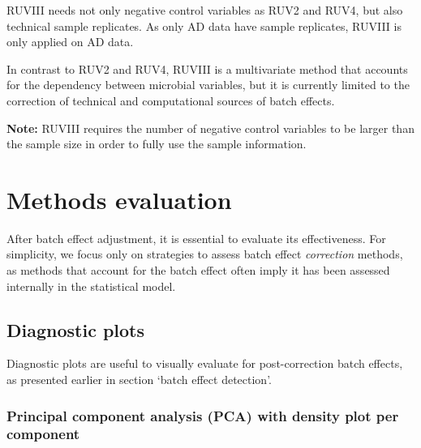 \documentclass[]{book}
\newenvironment{Shaded}{\begin{snugshade}}{\end{snugshade}}
\newcommand{\KeywordTok}[1]{\textcolor[rgb]{0.13,0.29,0.53}{\textbf{#1}}}
\newcommand{\DataTypeTok}[1]{\textcolor[rgb]{0.13,0.29,0.53}{#1}}
\newcommand{\StringTok}[1]{\textcolor[rgb]{0.31,0.60,0.02}{#1}}
\newcommand{\CommentTok}[1]{\textcolor[rgb]{0.56,0.35,0.01}{\textit{#1}}}
\newcommand{\OperatorTok}[1]{\textcolor[rgb]{0.81,0.36,0.00}{\textbf{#1}}}
\newcommand{\NormalTok}[1]{#1}
\begin{document}
RUVIII needs not only negative control variables as RUV2 and RUV4, but
also technical sample replicates. As only AD data have sample
replicates, RUVIII is only applied on AD data.

In contrast to RUV2 and RUV4, RUVIII is a multivariate method that
accounts for the dependency between microbial variables, but it is
currently limited to the correction of technical and computational
sources of batch effects.

\textbf{Note:} RUVIII requires the number of negative control variables
to be larger than the sample size in order to fully use the sample
information.

\begin{Shaded}
\end{Shaded}

\chapter{Methods evaluation}\label{eval}

After batch effect adjustment, it is essential to evaluate its
effectiveness. For simplicity, we focus only on strategies to assess
batch effect \emph{correction} methods, as methods that account for the
batch effect often imply it has been assessed internally in the
statistical model.

\section{Diagnostic plots}\label{diagnostic-plots}

Diagnostic plots are useful to visually evaluate for post-correction
batch effects, as presented earlier in section `batch effect detection'.

\subsection{Principal component analysis (PCA) with density plot per
component}\label{principal-component-analysis-pca-with-density-plot-per-component-1}
\end{document}
